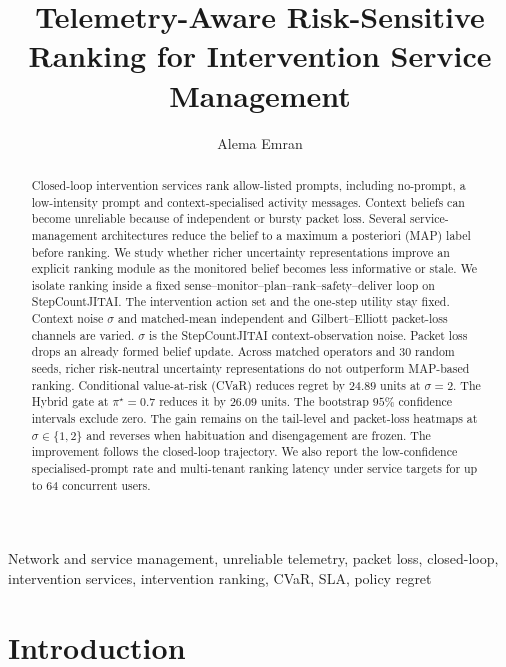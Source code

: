 \documentclass[journal]{IEEEtran}
\begin{document}
\title{Telemetry-Aware Risk-Sensitive Ranking for Intervention Service Management}

\author{Alema Emran}

\maketitle

\begin{abstract}
Closed-loop intervention services rank allow-listed prompts, including no-prompt, a low-intensity prompt and context-specialised activity messages. Context beliefs can become unreliable because of independent or bursty packet loss. Several service-management architectures reduce the belief to a maximum a posteriori (MAP) label before ranking. We study whether richer uncertainty representations improve an explicit ranking module as the monitored belief becomes less informative or stale.
We isolate ranking inside a fixed sense--monitor--plan--rank--safety--deliver loop on StepCountJITAI. The intervention action set and the one-step utility stay fixed. Context noise \(\sigma\) and matched-mean independent and Gilbert--Elliott packet-loss channels are varied. \(\sigma\) is the StepCountJITAI context-observation noise. Packet loss drops an already formed belief update.
Across matched operators and 30 random seeds, richer risk-neutral uncertainty representations do not outperform MAP-based ranking. Conditional value-at-risk (CVaR) reduces regret by \(24.89\) units at \(\sigma=2\). The Hybrid gate at \(\pi^\star=0.7\) reduces it by \(26.09\) units. The bootstrap \(95\%\) confidence intervals exclude zero. The gain remains on the tail-level and packet-loss heatmaps at \(\sigma\in\{1,2\}\) and reverses when habituation and disengagement are frozen. The improvement follows the closed-loop trajectory.
We also report the low-confidence specialised-prompt rate and multi-tenant ranking latency under service targets for up to \(64\) concurrent users.
\end{abstract}

\begin{IEEEkeywords}
Network and service management, unreliable telemetry, packet loss, closed-loop, intervention services, intervention ranking, CVaR, SLA, policy regret
\end{IEEEkeywords}

\section{Introduction}
\label{sec:introduction}
\end{document}

